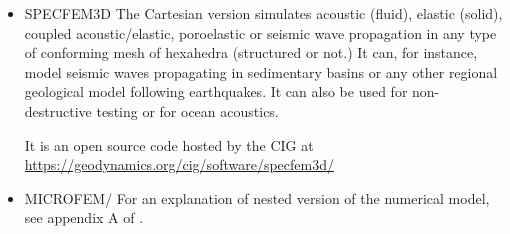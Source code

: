 \begin{itemize}
\begin{scriptsize}
\textcite{chlg08}
\textcite{chgu08}
\textcite{qula10}
\textcite{chss11}
\end{scriptsize}


\item {\codefont SPECFEM3D} 
The Cartesian version simulates acoustic (fluid), elastic (solid), coupled acoustic/elastic, 
poroelastic or seismic wave propagation in any type of conforming mesh of hexahedra 
(structured or not.) It can, for instance, model seismic waves propagating in sedimentary 
basins or any other regional geological model following earthquakes. It can also be used 
for non-destructive testing or for ocean acoustics. 

It is an open source code hosted by the CIG at 
\url{https://geodynamics.org/cig/software/specfem3d/}

{\small
\noindent
\textcite{kott05}
}

\item {\codefont MICROFEM}/\sopale
{}
For an explanation of nested version of the numerical model, see appendix A of \textcite{webe18}.


\end{itemize}
